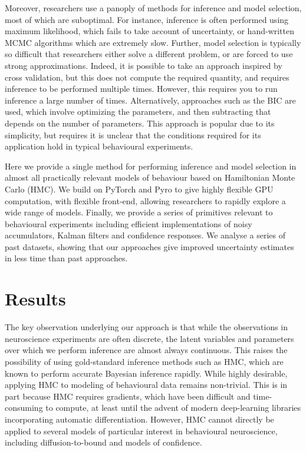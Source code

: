 \documentclass{article}
\begin{document}
Moreover, researchers use a panoply of methods for inference and model selection, most of which are suboptimal.
For instance, inference is often performed using maximum likelihood, which fails to take account of uncertainty, or hand-written MCMC algorithms which are extremely slow.
Further, model selection is typically so difficult that researchers either solve a different problem, or are forced to use strong approximations.
Indeed, it is possible to take an approach inspired by cross validation, but this does not compute the required quantity, and requires inference to be performed multiple times.
However, this requires you to run inference a large number of times.
Alternatively, approaches such as the BIC are used, which involve optimizing the parameters, and then subtracting that depends on the number of parameters.
This approach is popular due to its simplicity, but requires it is unclear that the conditions required for its application hold in typical behavioural experiments.

Here we provide a single method for performing inference and model selection in almost all practically relevant models of behaviour based on Hamiltonian Monte Carlo (HMC).
We build on PyTorch and Pyro to give highly flexible GPU computation, with flexible front-end, allowing researchers to rapidly explore a wide range of models.
Finally, we provide a series of primitives relevant to behavioural experiments including efficient implementations of noisy accumulators, Kalman filters and confidence responses.
We analyse a series of past datasets, showing that our approaches give improved uncertainty estimates in less time than past approaches.

\section{Results}

The key observation underlying our approach is that while the observations in neuroscience experiments are often discrete, the latent variables and parameters over which we perform inference are almost always continuous.
This raises the possibility of using gold-standard inference methods such as HMC, which are known to perform accurate Bayesian inference rapidly.
While highly desirable, applying HMC to modeling of behavioural data remains non-trivial.
This is in part because HMC requires gradients, which have been difficult and time-consuming to compute, at least until the advent of modern deep-learning libraries incorporating automatic differentiation.
However, HMC cannot directly be applied to several models of particular interest in behavioural neuroscience, including diffusion-to-bound and models of confidence. 
\end{document}
